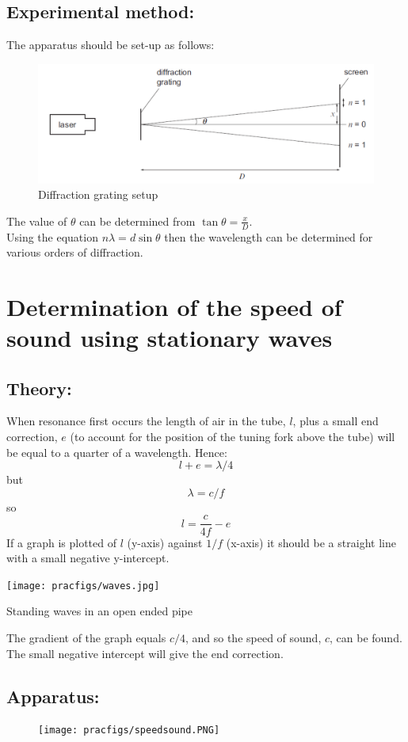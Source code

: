 \subsection{Experimental method:} 
The apparatus should be set-up as follows:  
\begin{figure}
\includegraphics[width=\textwidth]{diffractiongrating.PNG}
\caption{Diffraction grating setup}
\end{figure}
The value of $\theta$ can be determined from $\tan \theta = \frac{x}{D}$. \\ 
Using the equation $n \lambda  =d\sin \theta$ then the wavelength can be determined for various orders of diffraction. 
\section{Determination of the speed of sound using stationary waves}
\subsection{Theory:} 
When resonance first occurs the length of air in the tube, $l$, plus a small end correction, $e$ (to account for the position of the tuning fork above the tube) will be equal to a quarter of a wavelength. Hence: 
\[l + e = \lambda/4 \] but \[ \lambda = c/f \] so   \[l = \frac{c}{4f}-e\] If a graph is plotted of $l$ (y-axis) against $1/f$ (x-axis) it should be a straight line with a small negative y-intercept. \begin{marginfigure}
\texttt{[image: pracfigs/waves.jpg]}
\caption{Standing waves in an open ended pipe}
\end{marginfigure}
The gradient of the graph equals $c/4$, and so the speed of sound, $c$, can be found. The small negative intercept will give the end correction. 
\subsection{Apparatus:}   
\begin{figure}
\texttt{[image: pracfigs/speedsound.PNG]}
\end{figure}
   

